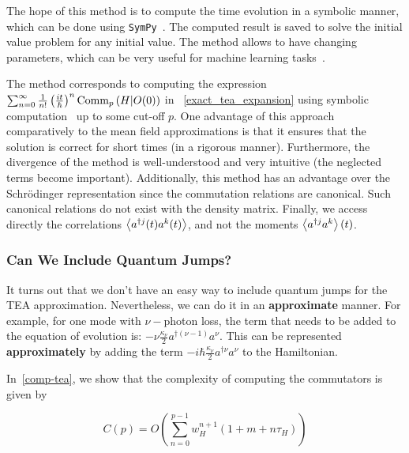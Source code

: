 The hope of this method is to compute the time evolution in a symbolic manner, which can be done using \texttt{SymPy}~\cite{sympy}. The computed result is saved to solve the initial value problem for any initial value. The method allows to have changing parameters, which can be very useful for machine learning tasks~\cite{taha_quandela, markovic2020physics, Dudas2023-xx}.

The method corresponds to computing the expression $\sum_{n = 0}^\infty \frac{1}{n!} \left(\frac{i t}{\hbar}\right)^n \text{Comm}_{p}\left(H | O(0)\right)$ in ~\autoref{exact_tea_expansion} using symbolic computation~\cite{sympy} up to some cut-off $p$. One advantage of this approach comparatively to the mean field approximations is that it ensures that the solution is correct for short times (in a rigorous manner). Furthermore, the divergence of the method is well-understood and very intuitive (the neglected terms become important). Additionally, this method has an advantage over the Schrödinger representation since the commutation relations are canonical. Such canonical relations do not exist with the density matrix. Finally, we access directly the correlations $\left\langle a^{\dagger j}(t) a^k(t) \right\rangle$, and not the moments $\left\langle a^{\dagger j} a^k \right\rangle(t)$.

\subsubsection{Can We Include Quantum Jumps?}
It turns out that we don't have an easy way to include quantum jumps for the TEA approximation. Nevertheless, we can do it in an \textbf{approximate} manner. For example, for one mode with $\nu-$photon loss, the term that needs to be added to the equation of evolution is: $- \nu \frac{\kappa_\nu}{2} a^{\dagger (\nu-1)} a^\nu$. This can be represented \textbf{approximately} by adding the term $-i \hbar \frac{\kappa_\nu}{2} a^{\dagger \nu} a^\nu$ to the Hamiltonian.

In~\autoref{comp-tea}, we show that the complexity of computing the commutators is given by

\begin{equation}
        C(p) = O\left(\sum_{n=0}^{p-1} w^{n+1}_H (1+m+n \tau_H)\right)
\end{equation}

